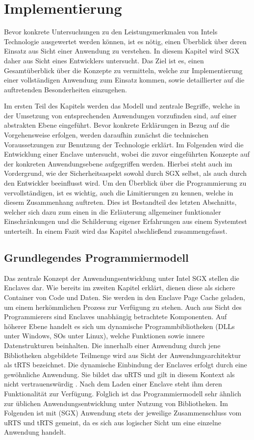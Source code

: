 
\chapter{Implementierung}

Bevor konkrete Untersuchungen zu den Leistungsmerkmalen von Intels Technologie ausgewertet werden können, ist es nötig, einen Überblick über deren Einsatz aus Sicht einer Anwendung zu verstehen. In diesem Kapitel wird \ac{SGX} daher aus Sicht eines Entwicklers untersucht. Das Ziel ist es, einen Gesamtüberblick über die Konzepte zu vermitteln, welche zur Implementierung einer vollständigen Anwendung zum Einsatz kommen, sowie detaillierter auf die auftretenden Besonderheiten einzugehen.

Im ersten Teil des Kapitels werden das Modell und zentrale Begriffe, welche in der Umsetzung von entsprechenden Anwendungen vorzufinden sind, auf einer abstrakten Ebene eingeführt. Bevor konkrete Erklärungen in Bezug auf die Vorgehensweise erfolgen, werden daraufhin zunächst die technischen Voraussetzungen zur Benutzung der Technologie erklärt. Im Folgenden wird die Entwicklung einer Enclave untersucht, wobei die zuvor eingeführten Konzepte auf der konkreten Anwendungsebene aufgegriffen werden. Hierbei steht auch im Vordergrund, wie der Sicherheitsaspekt sowohl durch \ac{SGX} selbst, als auch durch den Entwickler beeinflusst wird. Um den Überblick über die Programmierung zu vervollständigen, ist es wichtig, auch die Limitierungen zu kennen, welche in diesem Zusammenhang auftreten. Dies ist Bestandteil des letzten Abschnitts, welcher sich dazu zum einen in die Erläuterung allgemeiner funktionaler Einschränkungen und die Schilderung eigener Erfahrungen aus einem Systemtest unterteilt. In einem Fazit wird das Kapitel abschließend zusammengefasst.

\section{Grundlegendes Programmiermodell}

Das zentrale Konzept der Anwendungsentwicklung unter Intel \ac{SGX} stellen die Enclaves dar. Wie bereits im zweiten Kapitel erklärt, dienen diese als sichere Container von Code und Daten. Sie werden in den Enclave Page Cache geladen, um einem herkömmlichen Prozess zur Verfügung zu stehen. Auch aus Sicht des Programmierers sind Enclaves unabhängig betrachtete Komponenten. Auf höherer Ebene handelt es sich um dynamische Programmbibliotheken (\acp{DLL} unter Windows,  \acp{SO} unter Linux), welche Funktionen sowie innere Datenstrukturen beinhalten. Die innerhalb einer Anwendung durch jene Bibliotheken abgebildete Teilmenge wird aus Sicht der Anwendungsarchitektur als \ac{tRTS} bezeichnet. Die dynamische Einbindung der Enclaves erfolgt durch eine gewöhnliche Anwendung. Sie bildet das \ac{uRTS} und gilt in diesem Kontext als nicht vertrauenswürdig \cite{WinGuide}. Nach dem Laden einer Enclave steht ihm deren Funktionalität zur Verfügung. Folglich ist das Programmiermodell sehr ähnlich zur üblichen Anwendungsentwicklung unter Nutzung von Bibliotheken. Im Folgenden ist mit (\ac{SGX}) Anwendung stets der jeweilige Zusammenschluss vom \ac{uRTS} und \ac{tRTS} gemeint, da es sich aus logischer Sicht um eine einzelne Anwendung handelt.

